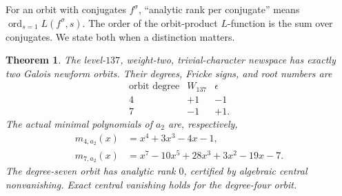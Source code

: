 \documentclass[11pt]{article}
\newtheorem{theorem}{Theorem}[section]
\theoremstyle{definition}
\theoremstyle{remark}
\DeclareMathOperator{\ord}{ord}
\begin{document}
For an orbit with conjugates $f^\sigma$, ``analytic rank per conjugate'' means
$\ord_{s=1}L(f^\sigma,s)$.  The order of the orbit-product $L$-function is the
sum over conjugates.  We state both when a distinction matters.

\begin{theorem}\label{thm:newform-orbits}
The level-$137$, weight-two, trivial-character newspace has exactly two Galois
newform orbits.  Their degrees, Fricke signs, and root numbers are
\[
\begin{array}{c|cc}
  \text{orbit degree} & W_{137} & \epsilon\\
  \hline
  4 & +1 & -1\\
  7 & -1 & +1.
\end{array}
\]
The actual minimal polynomials of $a_2$ are, respectively,
\begin{align}
  m_{4,a_2}(x)&=x^4+3x^3-4x-1,\label{eq:a2four}\\
  m_{7,a_2}(x)&=x^7-10x^5+28x^3+3x^2-19x-7.\label{eq:a2seven}
\end{align}
The degree-seven orbit has analytic rank $0$, certified by algebraic central
nonvanishing.  Exact central vanishing holds for the degree-four orbit.
\end{theorem}
\end{document}
